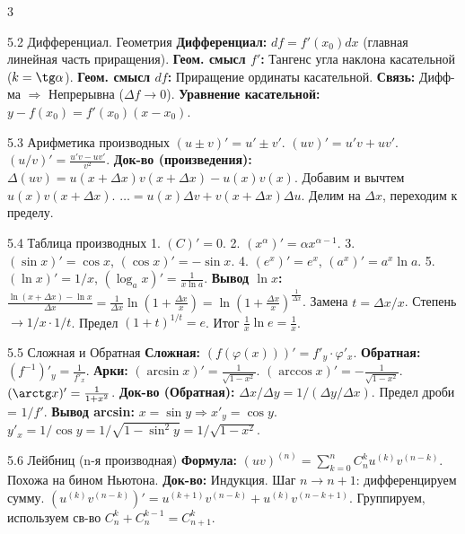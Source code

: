 \documentclass[8pt, a4paper, landscape]{extarticle}
\newcommand{\Ra}{\Rightarrow}
\begin{document}
\begin{multicols*}{3}
\begin{ticket}{5.2 Дифференциал. Геометрия}
\textbf{Дифференциал:} $df = f'(x_0) dx$ (главная линейная часть приращения).
\textbf{Геом. смысл $f'$:} Тангенс угла наклона касательной ($k = \tg \alpha$).
\textbf{Геом. смысл $df$:} Приращение ординаты касательной.
\textbf{Связь:} Дифф-ма $\Ra$ Непрерывна ($\Delta f \to 0$).
\tcblower
\textbf{Уравнение касательной:} $y - f(x_0) = f'(x_0)(x - x_0)$.
\end{ticket}

\begin{ticket}{5.3 Арифметика производных}
$(u \pm v)' = u' \pm v'$.
$(uv)' = u'v + uv'$.
$(u/v)' = \frac{u'v - uv'}{v^2}$.
\tcblower
\textbf{Док-во (произведения):}
$\Delta(uv) = u(x+\Delta x)v(x+\Delta x) - u(x)v(x)$.
Добавим и вычтем $u(x)v(x+\Delta x)$.
$\dots = u(x) \Delta v + v(x+\Delta x) \Delta u$.
Делим на $\Delta x$, переходим к пределу.
\end{ticket}

\begin{ticket}{5.4 Таблица производных}
1. $(C)' = 0$.
2. $(x^\alpha)' = \alpha x^{\alpha-1}$.
3. $(\sin x)' = \cos x$, $(\cos x)' = -\sin x$.
4. $(e^x)' = e^x$, $(a^x)' = a^x \ln a$.
5. $(\ln x)' = 1/x$, $(\log_a x)' = \frac{1}{x \ln a}$.
\tcblower
\textbf{Вывод $\ln x$:}
$\frac{\ln(x+\Delta x) - \ln x}{\Delta x} = \frac{1}{\Delta x} \ln(1+\frac{\Delta x}{x}) = \ln(1+\frac{\Delta x}{x})^{\frac{1}{\Delta x}}$.
Замена $t = \Delta x/x$. Степень $\to 1/x \cdot 1/t$.
Предел $(1+t)^{1/t} = e$. Итог $\frac{1}{x} \ln e = \frac{1}{x}$.
\end{ticket}

\begin{ticket}{5.5 Сложная и Обратная}
\textbf{Сложная:} $(f(\varphi(x)))' = f'_y \cdot \varphi'_x$.
\textbf{Обратная:} $(f^{-1})'_y = \frac{1}{f'_x}$.
\textbf{Арки:}
$(\arcsin x)' = \frac{1}{\sqrt{1-x^2}}$.
$(\arccos x)' = -\frac{1}{\sqrt{1-x^2}}$.
$(\arctg x)' = \frac{1}{1+x^2}$.
\tcblower
\textbf{Док-во (Обратная):}
$\Delta x / \Delta y = 1 / (\Delta y / \Delta x)$. Предел дроби = $1/f'$.
\textbf{Вывод arcsin:} $x = \sin y \Ra x'_y = \cos y$.
$y'_x = 1/\cos y = 1/\sqrt{1-\sin^2 y} = 1/\sqrt{1-x^2}$.
\end{ticket}

\begin{ticket}{5.6 Лейбниц (n-я производная)}
\textbf{Формула:} $(uv)^{(n)} = \sum_{k=0}^n C_n^k u^{(k)} v^{(n-k)}$.
Похожа на бином Ньютона.
\tcblower
\textbf{Док-во:} Индукция.
Шаг $n \to n+1$: дифференцируем сумму.
$(u^{(k)} v^{(n-k)})' = u^{(k+1)} v^{(n-k)} + u^{(k)} v^{(n-k+1)}$.
Группируем, используем св-во $C_n^k + C_n^{k-1} = C_{n+1}^k$.
\end{ticket}


\end{multicols*}
\end{document}
